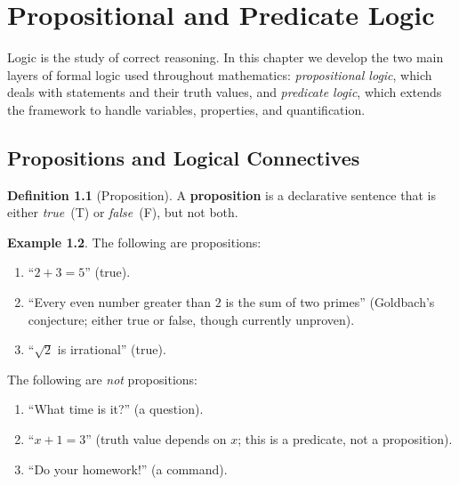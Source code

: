 \documentclass[12pt,a4paper,openany]{book}
\theoremstyle{definition}
\newtheorem{definition}{Definition}[chapter]
\newtheorem{example}[definition]{Example}
\theoremstyle{plain}
\theoremstyle{remark}
\begin{document}
\tableofcontents

\chapter{Propositional and Predicate Logic}
\label{ch:logic}

Logic is the study of correct reasoning. In this chapter we develop the two main
layers of formal logic used throughout mathematics: \emph{propositional logic}, which
deals with statements and their truth values, and \emph{predicate logic}, which extends
the framework to handle variables, properties, and quantification.

\section{Propositions and Logical Connectives}
\label{sec:propositions}

\begin{definition}[Proposition]
\label{def:proposition}
A \textbf{proposition} is a declarative sentence that is either
\emph{true}~(T) or \emph{false}~(F), but not both.
\end{definition}

\begin{example}
\label{ex:proposition-examples}
The following are propositions:
\begin{enumerate}[nosep]
  \item ``$2 + 3 = 5$'' \quad (true).
  \item ``Every even number greater than $2$ is the sum of two primes''
        \quad (Goldbach's conjecture; either true or false, though currently unproven).
  \item ``$\sqrt{2}$ is irrational'' \quad (true).
\end{enumerate}
The following are \emph{not} propositions:
\begin{enumerate}[nosep]
  \item ``What time is it?'' \quad (a question).
  \item ``$x + 1 = 3$'' \quad (truth value depends on $x$; this is a predicate, not a proposition).
  \item ``Do your homework!'' \quad (a command).
\end{enumerate}
\end{example}
\end{document}
